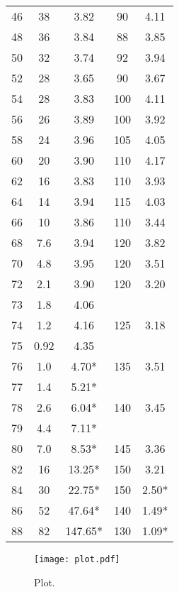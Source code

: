 \begin{table}
\begin{tabular}{S[table-format = 2.0] | c S[table-format = 3.2] | c S[table-format = 1.2]}
        46 & 38  &   3.82  & 90  & 4.11  \\
        48 & 36  &   3.84  & 88  & 3.85  \\
        50 & 32  &   3.74  & 92  & 3.94  \\
        52 & 28  &   3.65  & 90  & 3.67  \\
        54 & 28  &   3.83  & 100 & 4.11  \\
        56 & 26  &   3.89  & 100 & 3.92  \\
        58 & 24  &   3.96  & 105 & 4.05  \\
        60 & 20  &   3.90  & 110 & 4.17  \\
        62 & 16  &   3.83  & 110 & 3.93  \\
        64 & 14  &   3.94  & 115 & 4.03  \\
        66 & 10  &   3.86  & 110 & 3.44  \\
        68 & 7.6 &   3.94  & 120 & 3.82  \\
        70 & 4.8 &   3.95  & 120 & 3.51  \\
        72 & 2.1 &   3.90  & 120 & 3.20  \\
        73 & 1.8 &   4.06  &     &       \\
        74 & 1.2 &   4.16  & 125 & 3.18  \\
        75 & 0.92&   4.35  &     &       \\
        76 & 1.0 &   4.70* & 135 & 3.51  \\
        77 & 1.4 &   5.21* &     &       \\
        78 & 2.6 &   6.04* & 140 & 3.45  \\
        79 & 4.4 &   7.11* &     &       \\
        80 & 7.0 &   8.53* & 145 & 3.36  \\ 
        82 & 16  &  13.25* & 150 & 3.21  \\     
        84 & 30  &  22.75* & 150 & 2.50* \\    
        86 & 52  &  47.64* & 140 & 1.49* \\    
        88 & 82  & 147.65* & 130 & 1.09* \\    
    \bottomrule
  \end{tabular}
\end{table}

\begin{figure}
  \centering
  \texttt{[image: plot.pdf]}
  \caption{Plot.}
  \label{fig:plot}
\end{figure}

